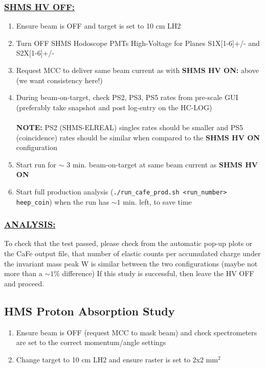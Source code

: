 \documentclass{article}
\begin{document}
\subsubsection*{\underline{SHMS HV OFF:}}
 \begin{enumerate}
    \item Ensure beam is OFF and target is set to 10 cm LH2
    \item Turn OFF SHMS Hodoscope PMTs High-Voltage for Planes S1X[1-6]+/- and S2X[1-6]+/- 
    \item Request MCC to deliver same beam current as with \textbf{SHMS HV ON:} above (we want consistency here!)
    \item During beam-on-target, check PS2, PS3, PS5 rates from pre-scale GUI (preferably take snapshot and post log-entry on the HC-LOG) \\\\ \textbf{NOTE:} PS2 (SHMS-ELREAL) singles rates should be smaller and PS5 (coincidence) rates should be similar when compared to the \textbf{SHMS HV ON} configuration 
    \item Start run for $\sim$ 3  min. beam-on-target at same beam current as \textbf{SHMS HV ON}
    \item Start full production analysis (\texttt{./run\_cafe\_prod.sh <run\_number> heep\_coin}) when the run has $\sim 1$ min. left, to save time
    \end{enumerate}
\subsubsection*{\underline{ANALYSIS:}}
 \begin{enumerate}
 To check that the test passed, please check from the automatic pop-up plots or the CaFe output file, that number of elastic counts per accumulated charge under the invariant mass peak W is similar between the two configurations (maybe not more than a $\sim 1\%$ difference)
 If this study is successful, then leave the HV OFF and proceed.
 \end{enumerate}
\subsection{HMS Proton Absorption Study}
\begin{enumerate}
    \item Ensure beam is OFF (request MCC to mask beam) and check spectrometers are
    set to the correct momentum/angle settings
    \item Change target to 10 cm LH2 and ensure raster is set to 2x2 mm$^{2}$
\end{enumerate}
\end{document}
